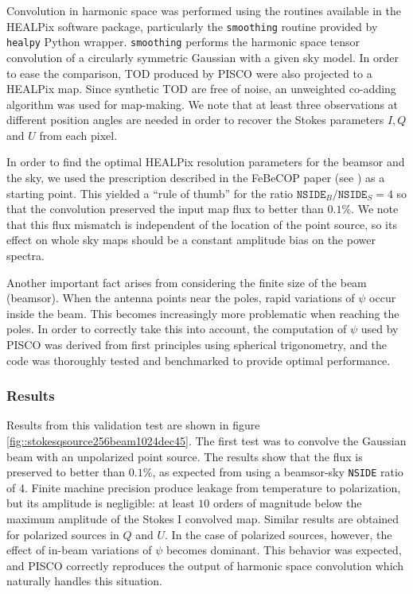 \documentclass[a4paper,11pt]{article}
\begin{document}
\noindent
Convolution in harmonic space was performed using the routines available in the HEALPix software package\cite{2005ApJ...622..759G}, particularly the \texttt{smoothing} routine provided by \texttt{healpy} Python wrapper. \texttt{smoothing} performs the harmonic space tensor convolution of a circularly symmetric Gaussian with a given sky model. In order to ease the comparison, TOD produced by PISCO were also projected to a HEALPix map. Since synthetic TOD are free of noise, an unweighted co-adding algorithm was used for map-making. We note that at least three observations at different position angles are needed in order to recover the Stokes parameters $I,Q$ and $U$ from each pixel.

In order to find the optimal HEALPix resolution parameters for the beamsor and the sky, we used the prescription described in the FeBeCOP paper (see \cite{2011ApJS..193....5M}) as a starting point. This yielded a ``rule of thumb'' for the ratio $\mathrm{\texttt{NSIDE}}_{B} / \mathrm{\texttt{NSIDE}}_{S} = 4$ so that the convolution preserved the input map flux to better than $0.1\%$. We note that this flux mismatch is independent of the location of the point source, so its effect on whole sky maps should be a constant amplitude bias on the power spectra.

Another important fact arises from considering the finite size of the beam (beamsor). When the antenna points near the poles, rapid variations of $\psi$ occur inside the beam. This becomes increasingly more problematic when reaching the poles. In order to correctly take this into account, the computation of $\psi$ used by PISCO was derived from first principles using spherical trigonometry, and the code was thoroughly tested and benchmarked to provide optimal performance. 

\subsubsection{Results}

Results from this validation test are shown in figure \ref{fig::stokesqsource256beam1024dec45}. The first test was to convolve the Gaussian beam with an unpolarized point source. The results show that the flux is preserved to better than $0.1\%$, as expected from using a beamsor-sky \texttt{NSIDE} ratio of 4. Finite machine precision produce leakage from temperature to polarization, but its amplitude is negligible: at least $10$ orders of magnitude below the maximum amplitude of the Stokes I convolved map. Similar results are obtained for polarized sources in $Q$ and $U$. In the case of polarized sources, however, the effect of in-beam variations of $\psi$ becomes dominant. This behavior was expected, and PISCO correctly reproduces the output of harmonic space convolution which naturally handles this situation.
\end{document}
